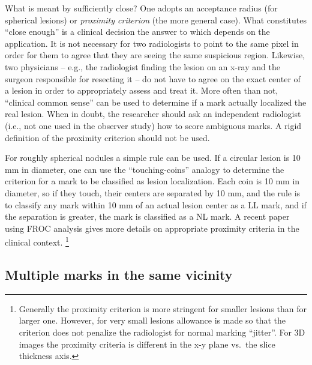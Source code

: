 \documentclass[
]{book}
\begin{document}
What is meant by sufficiently close? One adopts an acceptance radius (for spherical lesions) or \emph{proximity criterion} (the more general case). What constitutes ``close enough'' is a clinical decision the answer to which depends on the application. It is not necessary for two radiologists to point to the same pixel in order for them to agree that they are seeing the same suspicious region. Likewise, two physicians -- e.g., the radiologist finding the lesion on an x-ray and the surgeon responsible for resecting it -- do not have to agree on the exact center of a lesion in order to appropriately assess and treat it. More often than not, ``clinical common sense'' can be used to determine if a mark actually localized the real lesion. When in doubt, the researcher should ask an independent radiologist (i.e., not one used in the observer study) how to score ambiguous marks. A rigid definition of the proximity criterion should not be used.

For roughly spherical nodules a simple rule can be used. If a circular lesion is 10 mm in diameter, one can use the ``touching-coins'' analogy to determine the criterion for a mark to be classified as lesion localization. Each coin is 10 mm in diameter, so if they touch, their centers are separated by 10 mm, and the rule is to classify any mark within 10 mm of an actual lesion center as a LL mark, and if the separation is greater, the mark is classified as a NL mark. A recent paper \citep{Dobbins2016MultiInstitutional} using FROC analysis gives more details on appropriate proximity criteria in the clinical context. \footnote{Generally the proximity criterion is more stringent for smaller lesions than for larger one. However, for very small lesions allowance is made so that the criterion does not penalize the radiologist for normal marking ``jitter''. For 3D images the proximity criteria is different in the x-y plane vs.~the slice thickness axis.}

\hypertarget{multiple-marks-in-the-same-vicinity}{%
\subsection{Multiple marks in the same vicinity}\label{multiple-marks-in-the-same-vicinity}}
\end{document}
